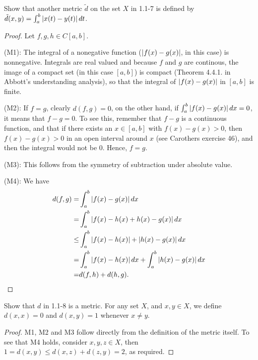 \begin{exercise}{8}
Show that another metric $\tilde{d}$ on the set $X$ in 1.1-7 is defined by $\tilde{d}(x,y)=\int_a^b\left\lvert x(t)-y(t)\right\rvert dt$.
\end{exercise}
\begin{proof}
Let $f,g,h\in C[a,b]$.

(M1): The integral of a nonegative function ($\left\lvert f(x)-g(x)\right\rvert$, in this case) is nonnegative. Integrals are real valued and because $f$ and $g$ are continous, the image of a compact set (in this case $[a,b]$) is compact (Theorem 4.4.1. in Abbott's understanding analysis), so that the integral of $\left\lvert f(x)-g(x)\right\rvert$ in $[a,b]$ is finite.

(M2): If $f=g$, clearly $d(f,g)=0$, on the other hand, if $\int_a^b\left\lvert f(x)-g(x)\right\rvert dx =0$, it means that $f-g=0$. To see this, remember that $f-g$ is a continuous function, and that if there exists an $x\in [a,b]$ with $f(x)-g(x)>0$, then $f(x)-g(x)>0$ in an open interval around $x$ (see Carothers exercise 46), and then the integral would not be 0. Hence, $f=g$.

(M3): This follows from the symmetry of subtraction under absolute value.

(M4): We have 
\begin{align*}
    d(f,g) =& \int_a^b\left\lvert f(x)-g(x)\right\rvert dx\\
    =&\int_a^b\left\lvert f(x)-h(x)+h(x)-g(x)\right\rvert dx\\
    \leq& \int_a^b\left\lvert f(x)-h(x)\right\rvert+\left\lvert h(x)-g(x)\right\rvert dx\\
    =& \int_a^b\left\lvert f(x)-h(x)\right\rvert dx+\int_a^b\left\lvert h(x)-g(x)\right\rvert dx\\
    =& d(f,h) + d(h,g).
\end{align*}
\end{proof}

\begin{exercise}{9}
Show that $d$ in 1.1-8 is a metric. For any set $X$, and $x,y\in X$, we define $d(x,x)=0$ and $d(x,y)=1$ whenever $x\neq y$.
\end{exercise}
\begin{proof}
M1, M2 and M3 follow directly from the definition of the metric itself. To see that M4 holds, consider $x,y,z\in X$, then $1=d(x,y)\leq d(x,z)+d(z,y)=2$, as required.
\end{proof}

